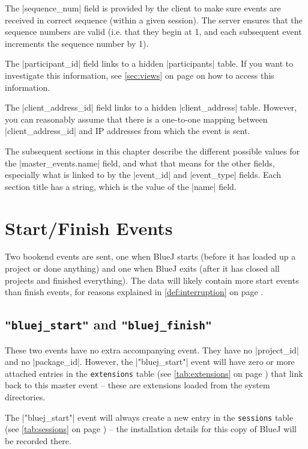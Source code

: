 \documentclass{report}
\newcommand{\myref}[1]{\autoref{#1} on page \pageref*{#1}}
\newcommand{\tabref}[1]{\lstinline|#1| table (see \myref{tab:#1})}
\begin{document}
The |sequence_num| field is provided by the client to make sure events are
received in correct sequence (within a given session).  The server ensures
that the sequence numbers are valid (i.e. that they begin at 1, and each
subsequent event increments the sequence number by 1).


The |participant_id| field links to a hidden |participants| table.  If you
want to investigate this information, see \myref{sec:views} on how to
access this information.


The |client_address_id| field links to a hidden |client_address| table.
However, you can reasonably assume that there is a one-to-one mapping between
|client_address_id| and IP addresses from which the event is sent.


The subsequent sections in this chapter describe the different possible values for the
|master_events.name| field, and what that means for the other fields,
especially what is linked to by the |event_id| and |event_type| fields.  Each
section title has a string, which is the value of the |name| field.

\section{Start/Finish Events}

Two bookend events are sent, one when BlueJ starts (before it has loaded up a
project or done anything) and one when BlueJ exits (after it has closed all
projects and finished everything).  The data will likely contain more start
events than finish events, for reasons explained in \myref{def:interruption}.

\subsection{\lstinline!"bluej_start"! and \lstinline!"bluej_finish"!}

These two events have no extra accompanying event.  They have no |project_id|
and no |package_id|.  However, the |"bluej_start"| event will have zero or more
attached entries in the \tabref{extensions} that link back to this master
event -- these are extensions loaded from the system directories.

The |"bluej_start"| event will always create a new entry in the
\tabref{sessions} -- the installation details for this copy of BlueJ will be
recorded there.
\end{document}
